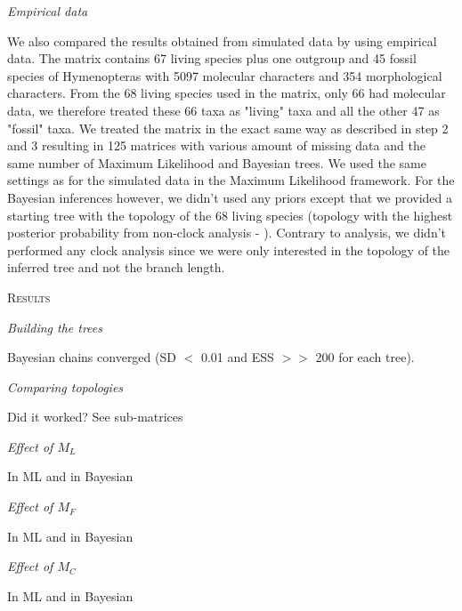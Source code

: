 \documentclass[12pt,letterpaper]{article}
\renewcommand{\section}[1]{%
\bigskip
\begin{center}
\begin{Large}
\normalfont\scshape #1
\medskip
\end{Large}
\end{center}}
\renewcommand{\subsection}[1]{%
\bigskip
\begin{center}
\begin{large}
\normalfont\itshape #1
\end{large}
\end{center}}
\begin{document}
\subsection{Empirical data} %
We also compared the results obtained from simulated data by using \citet{ronquista2012} empirical data.
The matrix contains 67 living species plus one outgroup and 45 fossil species of Hymenopteras with 5097 molecular characters and 354 morphological characters.
From the 68 living species used in the matrix, only 66 had molecular data, we therefore treated these 66 taxa as "living" taxa and all the other 47 as "fossil" taxa.
We treated the matrix in the exact same way as described in step 2 and 3 resulting in 125 matrices with various amount of missing data and the same number of Maximum Likelihood and Bayesian trees.
We used the same settings as for the simulated data in the Maximum Likelihood framework.
For the Bayesian inferences however, we didn’t used any priors except that we provided a starting tree with the topology of the 68 living species (topology with the highest posterior probability from non-clock analysis - \citet{ronquista2012}).
Contrary to \citet{ronquista2012} analysis, we didn’t performed any clock analysis since we were only interested in the topology of the inferred tree and not the branch length.

\section{Results}
\subsection{Building the trees}
Bayesian chains converged (SD $<$ 0.01 and ESS $>>$ 200 for each tree).
\subsection{Comparing topologies}
Did it worked? See sub-matrices
\subsection{Effect of $M_L$}
In ML and in Bayesian
\subsection{Effect of $M_F$}
In ML and in Bayesian
\subsection{Effect of $M_C$}
In ML and in Bayesian
\end{document}
